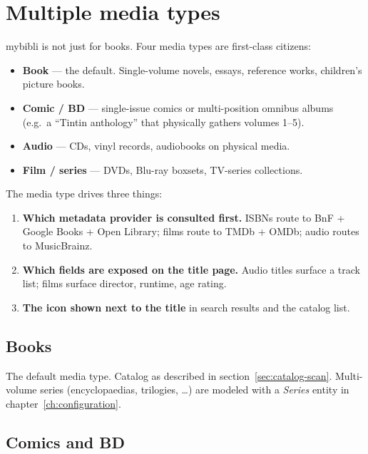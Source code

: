 \chapter{Multiple media types}
\label{ch:multimedia}

mybibli is not just for books. Four media
types are first-class citizens:

\begin{itemize}
  \item \textbf{Book} — the default. Single-volume novels, essays,
        reference works, children's picture books.
  \item \textbf{Comic / BD} — single-issue comics
        or multi-position omnibus albums (e.g.\ a ``Tintin
        anthology'' that physically gathers volumes 1--5).
  \item \textbf{Audio} — CDs, vinyl records, audiobooks on
        physical media.
  \item \textbf{Film / series} — DVDs, Blu-ray boxsets,
        TV-series collections.
\end{itemize}

The media type drives three things:

\begin{enumerate}
  \item \textbf{Which metadata provider is consulted first.} ISBNs
        route to BnF + Google Books + Open Library; films route to
        TMDb + OMDb; audio routes to MusicBrainz.
  \item \textbf{Which fields are exposed on the title page.}
        Audio titles surface a track list; films surface director,
        runtime, age rating.
  \item \textbf{The icon shown next to the title} in search results
        and the catalog list.
\end{enumerate}

\section{Books}

The default media type. Catalog as described in
section~\ref{sec:catalog-scan}. Multi-volume series (encyclopaedias,
trilogies, \dots) are modeled with a \emph{Series}
entity in chapter~\ref{ch:configuration}.

\section{Comics and BD}

